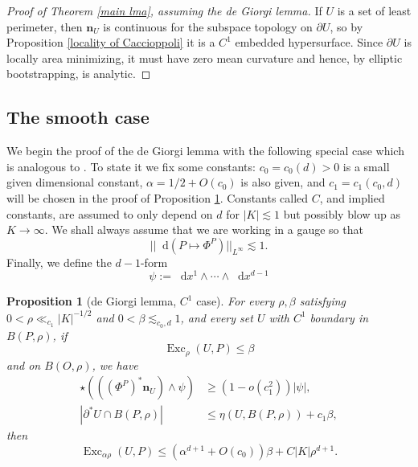 \documentclass[reqno,11pt]{amsart}
\DeclareMathOperator{\Exc}{Exc}
\newcommand*\dif{\mathop{}\!\mathrm{d}}
\newcommand{\normal}{\mathbf n}
\newtheorem{proposition}[theorem]{Proposition}
\theoremstyle{definition}
\numberwithin{equation}{section}
\begin{document}
\begin{proof}[Proof of Theorem \ref{main lma}, assuming the de Giorgi lemma]
If $U$ is a set of least perimeter, then $\normal_U$ is continuous for the subspace topology on $\partial U$, so by Proposition \ref{locality of Caccioppoli} it is a $C^1$ embedded hypersurface.
Since $\partial U$ is locally area minimizing, it must have zero mean curvature and hence, by elliptic bootstrapping, is analytic.
\end{proof}


\subsection{The smooth case}
We begin the proof of the de Giorgi lemma with the following special case which is analogous to \cite[Lemma 6.4]{Giusti77}.
To state it we fix some constants: $c_0 = c_0(d) > 0$ is a small given dimensional constant, $\alpha = 1/2 + O(c_0)$ is also given, and $c_1 = c_1(c_0, d)$ will be chosen in the proof of Proposition \ref{Miranda44}.
Constants called $C$, and implied constants, are assumed to only depend on $d$ for $|K| \lesssim 1$ but possibly blow up as $K \to \infty$.
We shall always assume that we are working in a gauge so that
\begin{equation}\label{oscillation of isometries}
||\dif(P \mapsto \Phi^P)||_{L^\infty} \lesssim 1.
\end{equation}
Finally, we define the $d-1$-form
$$\psi := \dif x^1 \wedge \cdots \wedge \dif x^{d - 1}$$

\begin{proposition}[de Giorgi lemma, $C^1$ case]\label{Miranda44}
For every $\rho, \beta$ satisfying $0 < \rho \ll_{c_1} |K|^{-1/2}$ and $0 < \beta \lesssim_{c_0, d} 1$, and every set $U$ with $C^1$ boundary in $B(P, \rho)$, if
$$\Exc_\rho(U, P) \leq \beta$$
and on $B(O, \rho)$, we have
\begin{align}
\star(((\Phi^P)^* \normal_U) \wedge \psi) &\geq (1 - o(c_1^2)) |\psi|, \label{Miranda44 normal hyp} \\
|\partial^* U \cap B(P, \rho)| &\leq \eta(U, B(P, \rho)) + c_1 \beta, \label{Miranda44 minimality hyp}
\end{align}
then
\begin{equation}\label{Miranda44 concl}
\Exc_{\alpha \rho} (U, P) \leq (\alpha^{d + 1} + O(c_0)) \beta + C|K|\rho^{d + 1}.
\end{equation}
\end{proposition}
\end{document}
